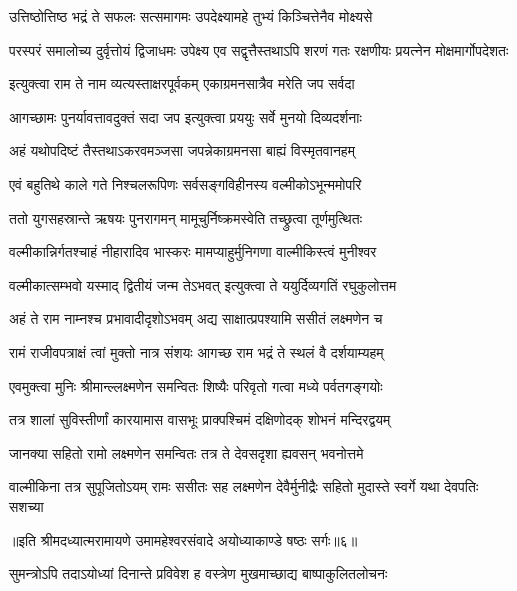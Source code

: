 \twolineshloka
{उत्तिष्ठोत्तिष्ठ भद्रं ते सफलः सत्समागमः}
{उपदेक्ष्यामहे तुभ्यं किञ्चित्तेनैव मोक्ष्यसे} %

\threelineshloka
{परस्परं समालोच्य दुर्वृत्तोयं द्विजाधमः}
{उपेक्ष्य एव सद्वृत्तैस्तथाऽपि शरणं गतः}
{रक्षणीयः प्रयत्नेन मोक्षमार्गोपदेशतः} %

\twolineshloka
{इत्युक्त्वा राम ते नाम व्यत्यस्ताक्षरपूर्वकम्}
{एकाग्रमनसात्रैव मरेति जप सर्वदा} %

\twolineshloka
{आगच्छामः पुनर्यावत्तावदुक्तं सदा जप}
{इत्युक्त्वा प्रययुः सर्वे मुनयो दिव्यदर्शनाः} %

\twolineshloka
{अहं यथोपदिष्टं तैस्तथाऽकरवमञ्जसा}
{जपन्नेकाग्रमनसा बाह्यं विस्मृतवानहम्} %

\twolineshloka
{एवं बहुतिथे काले गते निश्चलरूपिणः}
{सर्वसङ्गविहीनस्य वल्मीकोऽभून्ममोपरि} %

\twolineshloka
{ततो युगसहस्रान्ते ऋषयः पुनरागमन्}
{मामूचुर्निष्क्रमस्वेति तच्छ्रुत्वा तूर्णमुत्थितः} %

\twolineshloka
{वल्मीकान्निर्गतश्चाहं नीहारादिव भास्करः}
{मामप्याहुर्मुनिगणा वाल्मीकिस्त्वं मुनीश्वर} %

\twolineshloka
{वल्मीकात्सम्भवो यस्माद् द्वितीयं जन्म तेऽभवत्}
{इत्युक्त्वा ते ययुर्दिव्यगतिं रघुकुलोत्तम} %

\twolineshloka
{अहं ते राम नाम्नश्च प्रभावादीदृशोऽभवम्}
{अद्य साक्षात्प्रपश्यामि ससीतं लक्ष्मणेन च} %

\twolineshloka
{रामं राजीवपत्राक्षं त्वां मुक्तो नात्र संशयः}
{आगच्छ राम भद्रं ते स्थलं वै दर्शयाम्यहम्} %

\twolineshloka
{एवमुक्त्वा मुनिः श्रीमान्ल्लक्ष्मणेन समन्वितः}
{शिष्यैः परिवृतो गत्वा मध्ये पर्वतगङ्गयोः} %

\twolineshloka
{तत्र शालां सुविस्तीर्णां कारयामास वासभूः}
{प्राक्पश्चिमं दक्षिणोदक् शोभनं मन्दिरद्वयम्} %

\twolineshloka
{जानक्या सहितो रामो लक्ष्मणेन समन्वितः}
{तत्र ते देवसदृशा ह्यवसन् भवनोत्तमे} %

\fourlineindentedshloka
{वाल्मीकिना तत्र सुपूजितोऽयम्}
{रामः ससीतः सह लक्ष्मणेन}
{देवैर्मुनीद्रैः सहितो मुदास्ते}
{स्वर्गे यथा देवपतिः सशच्या} %

{॥इति श्रीमदध्यात्मरामायणे उमामहेश्वरसंवादे
अयोध्याकाण्डे षष्ठः सर्गः॥६॥
}




\twolineshloka
{सुमन्त्रोऽपि तदाऽयोध्यां दिनान्ते प्रविवेश ह}
{वस्त्रेण मुखमाच्छाद्य बाष्पाकुलितलोचनः} %


